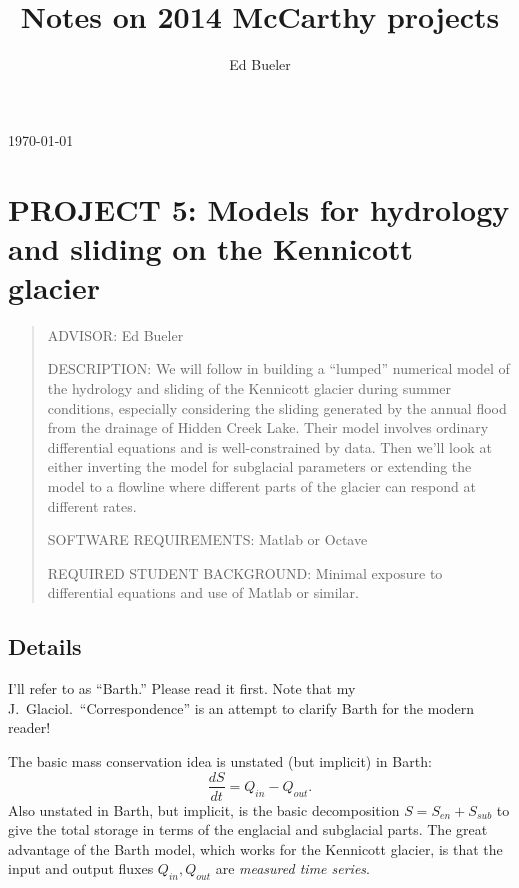 \documentclass[11pt,final]{amsart}%
\title[]{Notes on 2014 McCarthy projects}
\author[]{Ed Bueler}
\newcommand{\citep}[1]{\cite{#1}}
\begin{document}

\scriptsize \hfill \today \normalsize
\vspace{0.5in}

\maketitle
\thispagestyle{empty}

\setcounter{equation}{14}

\section*{PROJECT 5: Models for hydrology and sliding on the Kennicott glacier}

\begin{quote}
\noindent ADVISOR: Ed Bueler

\medskip
\noindent DESCRIPTION: We will follow \cite{Bartholomausetal2011} in building a ``lumped'' numerical model of the hydrology and sliding of the Kennicott glacier during summer conditions, especially considering the sliding generated by the annual flood from the drainage of Hidden Creek Lake.  Their model involves ordinary differential equations and is well-constrained by data.  Then we'll look at either inverting the model for subglacial parameters or extending the model to a flowline where different parts of the glacier can respond at different rates.

\medskip
\noindent SOFTWARE REQUIREMENTS: Matlab or Octave

\medskip
\noindent REQUIRED STUDENT BACKGROUND: Minimal exposure to differential equations and use of Matlab or similar.
\end{quote}

\subsection*{Details}  I'll refer to  \cite{Bartholomausetal2011} as ``Barth.''  Please read it first.  Note that my J.~Glaciol.~``Correspondence'' \citep{Bueler2014correspondence} is an attempt to clarify Barth for the modern reader!

The basic mass conservation idea is unstated (but implicit) in Barth:
\begin{equation}
\frac{dS}{dt} = Q_{in} - Q_{out}. \label{eq:massconserve}
\end{equation}
Also unstated in Barth, but implicit, is the basic decomposition $S = S_{en} + S_{sub}$ to give the total storage in terms of the englacial and subglacial parts.  The great advantage of the Barth model, which works for the Kennicott glacier, is that the input and output fluxes $Q_{in},Q_{out}$ are \emph{measured time series}.
\end{document}
